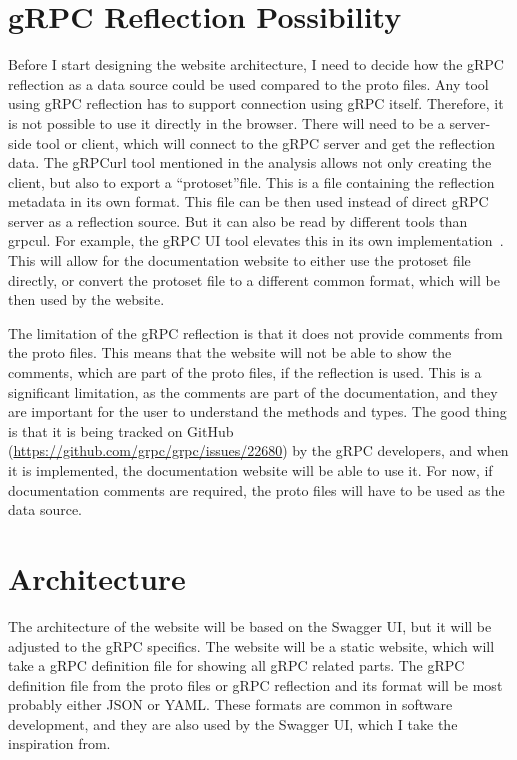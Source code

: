 \section{gRPC Reflection Possibility}
Before I start designing the website architecture, I need to decide how the gRPC reflection as a data source could be used compared to the proto files.
Any tool using gRPC reflection has to support connection using gRPC itself.
Therefore, it is not possible to use it directly in the browser.
There will need to be a server-side tool or client, which will connect to the gRPC server and get the reflection data.
The gRPCurl tool mentioned in the analysis allows not only creating the client, but also to export a \enquote{protoset}file.
This is a file containing the reflection metadata in its own format.
This file can be then used instead of direct gRPC server as a reflection source.
But it can also be read by different tools than grpcul.
For example, the gRPC UI tool elevates this in its own implementation~\cite{grpc-grpcui}.
This will allow for the documentation website to either use the protoset file directly, or convert the protoset file to a different common format, which will be then used by the website.

The limitation of the gRPC reflection is that it does not provide comments from the proto files.
This means that the website will not be able to show the comments, which are part of the proto files, if the reflection is used.
This is a significant limitation, as the comments are part of the documentation, and they are important for the user to understand the methods and types.
The good thing is that it is being tracked on GitHub (\url{https://github.com/grpc/grpc/issues/22680}) by the gRPC developers, and when it is implemented, the documentation website will be able to use it.
For now, if documentation comments are required, the proto files will have to be used as the data source.


\section{Architecture}
The architecture of the website will be based on the Swagger UI, but it will be adjusted to the gRPC specifics.
The website will be a static website, which will take a gRPC definition file for showing all gRPC related parts.
The gRPC definition file from the proto files or gRPC reflection and its format will be most probably either JSON or YAML\@.
These formats are common in software development, and they are also used by the Swagger UI, which I take the inspiration from.

